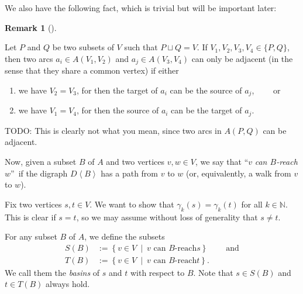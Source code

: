 \documentclass[numbers=enddot,12pt,final,onecolumn,notitlepage]{scrartcl}%
\theoremstyle{definition}
\newtheorem{remk}[theo]{Remark}
\newenvironment{remark}[1][]
{\begin{remk}[#1]\begin{leftbar}}
{\end{leftbar}\end{remk}}
\theoremstyle{plainsl}
\begin{document}
We also have the following fact, which is trivial but will be important later:

\begin{remark}
\label{adjarcs}
    Let $P$ and $Q$ be two subsets of $V$ such that $P \sqcup Q = V$.
    If $V_{1},V_{2},V_{3},V_{4} \in \{P,Q\}$, then two arcs $a_{i} \in A(V_{1},V_{2})$ and $a_{j} \in A(V_{3},V_{4})$ can only be adjacent (in the sense that they share a common vertex) if either \begin{enumerate}
        \item  we have $V_{2} = V_{3}$, for then the target of $a_{i}$ can be the source of $a_{j}$, \ \ \ \ or
        \item  we have $V_{1} = V_{4}$, for then the source of $a_{i}$ can be the target of $a_{j}$.
    \end{enumerate}
	TODO: This is clearly not what you mean, since two arcs in $A(P,Q)$ can be adjacent.
\end{remark}

Now, given a subset $B$ of $A$ and two vertices $v,w\in V$, we say that
\textquotedblleft$v$ \emph{can $B$-reach} $w$\textquotedblright\ if the digraph
$D\left\langle B\right\rangle $ has a path from $v$ to $w$ (or, equivalently,
a walk from $v$ to $w$).

Fix two vertices $s,t\in V$. We want to show that $\gamma_{k}\left(  s\right)
=\gamma_{k}\left(  t\right)  $ for all $k\in\mathbb{N}$. This is clear if
$s=t$, so we may assume without loss of generality that $s\neq t$.

For any subset $B$ of $A$, we define the subsets%
\begin{align*}
S\left(  B\right)   &  :=\left\{  v\in V\ \mid\ v\text{ can }B\text{-reach
}s\right\}  \ \ \ \ \ \ \ \ \ \ \text{and}\\
T\left(  B\right)   &  :=\left\{  v\in V\ \mid\ v\text{ can }B\text{-reach
}t\right\}  .
\end{align*}
We call them the \emph{basins} of $s$ and $t$ with respect to $B$. Note that
$s\in S\left(  B\right)  $ and $t\in T\left(  B\right)  $ always hold.
\end{document}
